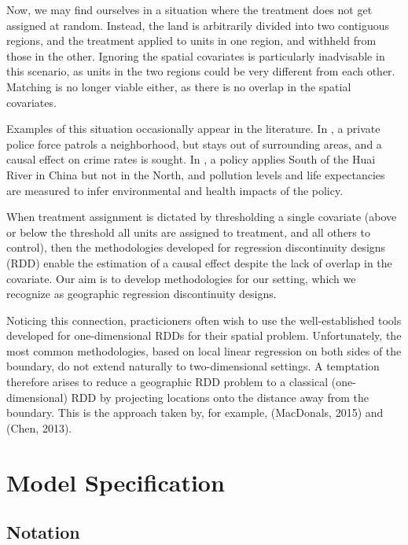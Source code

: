 \documentclass[letter]{article}
\renewcommand{\cite}[1]{\citep{#1}}
\begin{document}
Now, we may find ourselves in a situation where the treatment does not
get assigned at random. Instead, the land is arbitrarily divided into
two contiguous regions, and the treatment applied to units in one
region, and withheld from those in the other. Ignoring the spatial
covariates is particularly inadvisable in this scenario, as units in the
two regions could be very different from each other. Matching is no
longer viable either, as there is no overlap in the spatial covariates.

Examples of this situation occasionally appear in the literature. In
\cite{macdonald2015effect}, a private police force patrols a
neighborhood, but stays out of surrounding areas, and a causal effect on
crime rates is sought. In \cite{chen2013evidence}, a policy applies
South of the Huai River in China but not in the North, and pollution
levels and life expectancies are measured to infer environmental and
health impacts of the policy.

When treatment assignment is dictated by thresholding a single covariate
(above or below the threshold all units are assigned to treatment, and
all others to control), then the methodologies developed for regression
discontinuity designs (RDD) enable the estimation of a causal effect
despite the lack of overlap in the covariate. Our aim is to develop
methodologies for our setting, which we recognize as geographic
regression discontinuity designs.

Noticing this connection, practicioners often wish to use the
well-established tools developed for one-dimensional RDDs for their
spatial problem. Unfortunately, the most common methodologies, based on
local linear regression on both sides of the boundary, do not extend
naturally to two-dimensional settings. A temptation therefore arises to
reduce a geographic RDD problem to a classical (one-dimensional) RDD by
projecting locations onto the distance away from the boundary. This is
the approach taken by, for example, (MacDonals, 2015) and (Chen, 2013).
    


    	\section{Model Specification}\label{model-specification}

\subsection{Notation}\label{notation}
\end{document}
